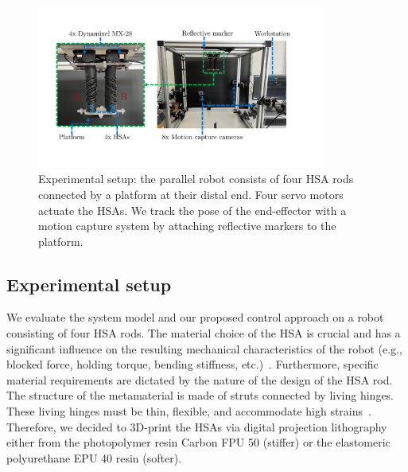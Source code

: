 \begin{figure}[t]
    \centering
    \includegraphics[width=0.85\textwidth]{hsacontrol/figures/experimental_setup_v2_cropped_compressed.pdf}
    \caption{Experimental setup: the parallel robot consists of four HSA rods connected by a platform at their distal end. Four servo motors actuate the HSAs. We track the pose of the end-effector with a motion capture system by attaching reflective markers to the platform.}
    \label{fig:hsacontrol:experimental_setup}
\end{figure}

\subsection{Experimental setup}\label{sub:hsacontrol:configuration_space_regulation:experimental_setup}
We evaluate the system model and our proposed control approach on a robot consisting of four HSA rods.
The material choice of the \gls{HSA} is crucial and has a significant influence on the resulting mechanical characteristics of the robot  (e.g., blocked force, holding torque, bending stiffness, etc.)~\cite{truby2021recipe}. Furthermore, specific material requirements are dictated by the nature of the design of the \gls{HSA} rod. The structure of the metamaterial is made of struts connected by living hinges. These living hinges must be thin, flexible, and accommodate high strains~\cite{truby2021recipe}.
Therefore, we decided to 3D-print the \glspl{HSA} via digital projection lithography either from the photopolymer resin Carbon FPU 50 (stiffer) or the elastomeric polyurethane EPU 40 resin (softer).

